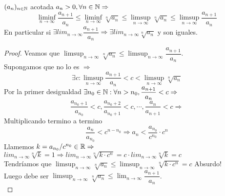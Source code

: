 \begin{theorem}
  $(a_n)_{n \in \mathbb{N}}$ acotada $a_n > 0, \forall n \in \mathbb{N} \Rightarrow$ \\
  \begin{equation}
    \liminf_{n \to \infty} \dfrac{a_{n+1}}{a_n} \leq \liminf_{n \to \infty} \sqrt[n]{a_n} \leq \limsup_{n \to \infty} \sqrt[n]{a_n} \leq \limsup_{n \to \infty} \dfrac{a_{n+1}}{a_n}
  \end{equation}
  En particular si $\exists lim_{n \to \infty} \dfrac{a_{n+1}}{a_n} \Rightarrow \exists lim_{n \to \infty} \sqrt[n]{a_n}$ y son iguales.

  \begin{proof}
    Veamos que $\limsup_{n \to \infty} \sqrt[n]{a_n} \leq \limsup_{n \to \infty} \dfrac{a_{n+1}}{a_n}$. \\
    Supongamos que no lo es $\Rightarrow$
    \begin{equation}
      \exists c : \limsup_{n \to \infty} \dfrac{a_{n+1}}{a_n} < c < \limsup_{n \to \infty} \sqrt[n]{a_n}
    \end{equation}
    Por la primer desigualdad $\exists n_0 \in \mathbb{N} : \forall n > n_0, \dfrac{a_{n+1}}{a_n} < c \Rightarrow$ \\
    \begin{equation}
      \dfrac{a_{n_0+1}}{a_{n_0}} < c, \dfrac{a_{n_0+2}}{a_{n_0+1}} < c, \cdots, \dfrac{a_n}{a_{n+1}} < c \Rightarrow
    \end{equation}
    Multiplicando termino a termino 
    \begin{equation}
      \dfrac{a_n}{a_{n_0}} < c^{n - n_0} \Rightarrow a_n < \dfrac{a_{n_0}}{c^{n_0}} \cdot c^n
    \end{equation}
    Llamemos $k = a_{n_0}/c^{n_0} \in \mathbb{R} \Rightarrow$
    $lim_{n \to \infty} \sqrt[n]{k} = 1 \Rightarrow lim_{n \to \infty} \sqrt[n]{k \cdot c^n} = c \cdot lim_{n \to \infty} \sqrt[n]{k} = c$ \\
    Tendríamos que $\limsup_{n \to \infty} \sqrt[n]{a_n} \leq \limsup_{n \to \infty} \sqrt[n]{k \cdot c^n} = c$ Absurdo! \\
    Luego debe ser $\limsup_{n \to \infty} \sqrt[n]{a_n} \leq \lim_{n \to \infty} \dfrac{a_{n+1}}{a_n}$. \\


  \end{proof}
\end{theorem}

